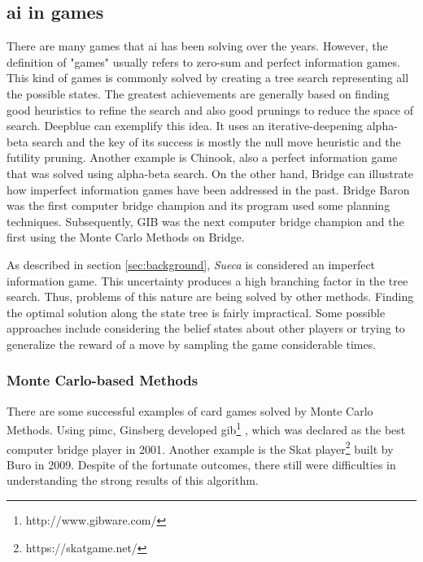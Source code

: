 \subsection{\gls{ai} in games}
 
 
There are many games that \gls{ai} has been solving over the years.
However, the definition of "games" usually refers to zero-sum and perfect information games.
This kind of games is commonly solved by creating a tree search representing all the possible states.
The greatest achievements are generally based on finding good heuristics to refine the search and also good prunings to reduce the space of search.
Deepblue can exemplify this idea.
It uses an iterative-deepening alpha-beta search and the key of its success is mostly the null move heuristic and the futility pruning.
Another example is Chinook, also a perfect information game that was solved using alpha-beta search.
On the other hand, Bridge can illustrate how imperfect information games have been addressed in the past.
Bridge Baron was the first computer bridge champion and its program used some planning techniques.
Subsequently, GIB was the next computer bridge champion and the first using the Monte Carlo Methods on Bridge.


As described in section \ref{sec:background}, \emph{Sueca} is considered an imperfect information game.
This uncertainty produces a high branching factor in the tree search.
Thus, problems of this nature are being solved by other methods.
Finding the optimal solution along the state tree is fairly impractical.
Some possible approaches include considering the belief states about other players or trying to generalize the reward of a move by sampling the game considerable times.



\subsubsection{Monte Carlo-based Methods}


There are some successful examples of card games solved by Monte Carlo Methods.
Using \gls{pimc}, Ginsberg developed \gls{gib}\footnote{http://www.gibware.com/} \cite{Ginsberg2001}, which was declared as the best computer bridge player in 2001.
Another example is the Skat player\footnote{https://skatgame.net/} built by Buro in 2009.
Despite of the fortunate outcomes, there still were difficulties in understanding the strong results of this algorithm.


